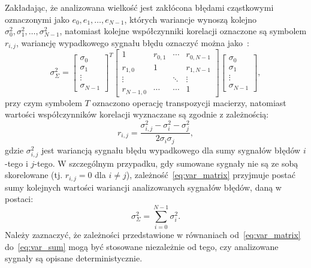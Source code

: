 Zakładając, że analizowana wielkość jest zakłócona błędami cząstkowymi oznaczonymi jako $e_{0}, e_{1}, \hdots, e_{N-1}$, których wariancje wynoszą kolejno $\sigma_{0}^{2}, \sigma_{1}^{2}, \hdots, \sigma_{N-1}^{2}$, natomiast kolejne współczynniki korelacji oznaczone są symbolem $r_{i,j}$, wariancję wypadkowego sygnału błędu oznaczyć można jako~\cite{jcgm_guide}:
\begin{equation}
\sigma_{\Sigma}^{2} =
\begin{bmatrix}
\sigma_{0} \\ \sigma_{1} \\ \vdots \\ \sigma_{N-1}
\end{bmatrix}^{T}
\begin{bmatrix}
1         & r_{0,1} & \cdots & r_{0,N-1} \\
r_{1,0}   & 1       &        & r_{1,N-1} \\
\vdots    &         & \ddots & \vdots    \\
r_{N-1,0} & \cdots  & \cdots & 1
\end{bmatrix}
\begin{bmatrix}
\sigma_{0} \\ \sigma_{1} \\ \vdots \\ \sigma_{N-1}
\end{bmatrix}
\label{eq:var_matrix},
\end{equation}
przy czym symbolem $T$ oznaczono operację transpozycji macierzy, natomiast wartości współczynników korelacji wyznaczane są zgodnie z zależnością:
\begin{equation}
r_{i,j} = \frac{\sigma_{i,j}^{2} - \sigma_{i}^{2} - \sigma_{j}^{2}}{2 \sigma_{i} \sigma_{j}} \label{eq:var_corr},
\end{equation}
gdzie $\sigma_{i,j}^{2}$ jest wariancją sygnału błędu wypadkowego dla sumy sygnałów błędów $i$-tego i $j$-tego. W szczególnym przypadku, gdy sumowane sygnały nie są ze sobą skorelowane (tj. $r_{i,j} = 0$ dla $i \ne j$), zależność~\eqref{eq:var_matrix} przyjmuje postać sumy kolejnych wartości wariancji analizowanych sygnałów błędów, daną w postaci:
\begin{equation}
\sigma_{\Sigma}^{2} = \sum _{i = 0} ^{N-1} \sigma_{i}^{2} \label{eq:var_sum}.
\end{equation}
Należy zaznaczyć, że zależności przedstawione w równaniach od~\eqref{eq:var_matrix} do~\eqref{eq:var_sum} mogą być stosowane niezależnie od tego, czy analizowane sygnały są opisane deterministycznie.

